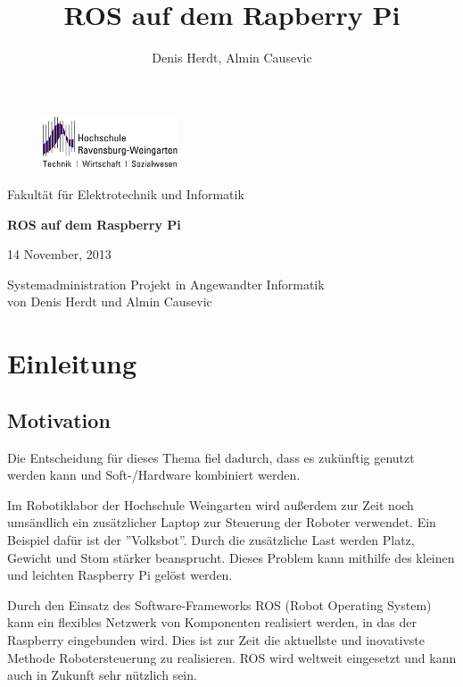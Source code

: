 \documentclass[12pt]{article}
\author{Denis Herdt, Almin Causevic}
\title{ROS auf dem Rapberry Pi}
\begin{document}
\begin{figure}[h]

\includegraphics[width=4cm]{hs-logo.jpg}
\end{figure}
Fakultät für Elektrotechnik und Informatik

\vspace{3cm}

\begin{center}

{\bf \huge ROS auf dem Raspberry Pi}
\vspace{4cm}

14 November, 2013
\vspace{1cm}

Systemadministration Projekt in Angewandter Informatik \\
von Denis Herdt und Almin Causevic

\end{center}

\pagebreak

\tableofcontents

\pagebreak

\section{Einleitung}

\subsection{Motivation}

Die Entscheidung für dieses Thema fiel dadurch, dass es zukünftig genutzt werden kann und Soft-/Hardware kombiniert werden.

Im Robotiklabor der Hochschule Weingarten wird außerdem zur Zeit noch umsändlich ein zusätzlicher Laptop zur Steuerung der Roboter verwendet. Ein Beispiel dafür ist der ''Volksbot''. Durch die zusätzliche Last werden Platz, Gewicht und Stom stärker beansprucht. Dieses Problem kann mithilfe des kleinen und leichten Raspberry Pi gelöst werden.

Durch den Einsatz des Software-Frameworks ROS (Robot Operating System) kann ein flexibles Netzwerk von Komponenten realisiert werden, in das der Raspberry eingebunden wird. Dies ist zur Zeit die aktuellste und inovativste Methode Robotersteuerung zu realisieren. ROS wird weltweit eingesetzt und kann auch in Zukunft sehr nützlich sein.
\end{document}
